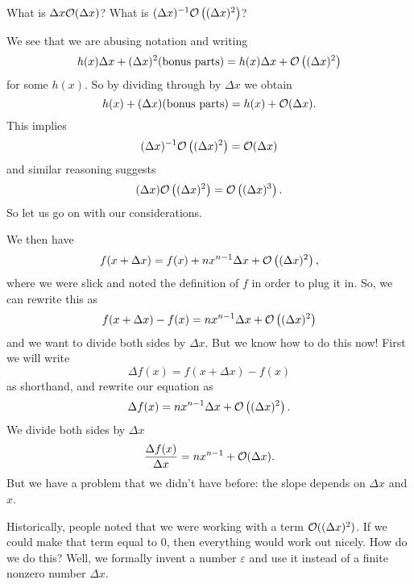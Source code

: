 \begin{problem}
What is $\Delta x\mathcal{O}(\Delta x)$? What is $(\Delta
x)^{-1}\mathcal{O}\left((\Delta x)^{2}\right)$? 
\end{problem}

We see that we are abusing notation and writing
\begin{equation}
h(x)\Delta x+(\Delta x)^{2}(\mbox{bonus parts})=h(x)\Delta x+\mathcal{O}\left((\Delta x)^{2}\right)
\end{equation}
for some $h(x)$. So by dividing through by $\Delta x$ we obtain
\begin{equation}
h(x)+(\Delta x)(\mbox{bonus parts})=h(x)+\mathcal{O}(\Delta x).
\end{equation}
This implies
\begin{equation}
(\Delta x)^{-1}\mathcal{O}\left((\Delta x)^{2}\right)=\mathcal{O}(\Delta x)
\end{equation}
and similar reasoning suggests
\begin{equation}
(\Delta x)\mathcal{O}\left((\Delta x)^{2}\right)=\mathcal{O}\left((\Delta x)^{3}\right).
\end{equation}
So let us go on with our considerations.

We then have
\begin{equation}
f(x+\Delta x)=f(x)+nx^{n-1}\Delta x+\mathcal{O}\left((\Delta x)^{2}\right),
\end{equation}
where we were slick and noted the definition of $f$ in order to
plug it in. So, we can rewrite this as
\begin{equation}
f(x+\Delta x)-f(x)=nx^{n-1}\Delta x+\mathcal{O}\left((\Delta x)^{2}\right)
\end{equation}
and we want to divide both sides by $\Delta x$. But we know how
to do this now! First we will write
\begin{equation}
\Delta f(x)=f(x+\Delta x)-f(x)
\end{equation}
as shorthand, and rewrite our equation as
\begin{equation}
\Delta f(x)=nx^{n-1}\Delta x+\mathcal{O}\left((\Delta x)^{2}\right).
\end{equation}
We divide both sides by $\Delta x$
\begin{equation}
\frac{\Delta f(x)}{\Delta x}=nx^{n-1}+\mathcal{O}(\Delta x).
\end{equation}
But we have a problem that we didn't have before: the slope
depends on $\Delta x$ and $x$. 

Historically, people noted that we were working with a term
$\mathcal{O}((\Delta x)^{2})$. If we could make that term equal to 0,
then everything would work out nicely. How do we do this? Well,
we formally invent a number $\varepsilon$ and use it instead of a
finite nonzero number $\Delta x$.


